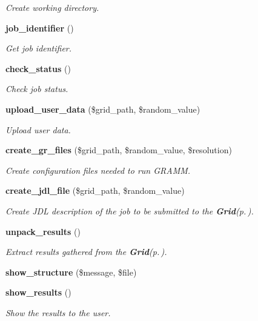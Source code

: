 \begin{CompactItemize}
\begin{CompactList}\small\item\em Create working directory. \item\end{CompactList}\item 
{\bf job\_\-identifier} ()
\begin{CompactList}\small\item\em Get job identifier. \item\end{CompactList}\item 
{\bf check\_\-status} ()
\begin{CompactList}\small\item\em Check job status. \item\end{CompactList}\item 
{\bf upload\_\-user\_\-data} (\$grid\_\-path, \$random\_\-value)
\begin{CompactList}\small\item\em Upload user data. \item\end{CompactList}\item 
{\bf create\_\-gr\_\-files} (\$grid\_\-path, \$random\_\-value, \$resolution)
\begin{CompactList}\small\item\em Create configuration files needed to run GRAMM. \item\end{CompactList}\item 
{\bf create\_\-jdl\_\-file} (\$grid\_\-path, \$random\_\-value)
\begin{CompactList}\small\item\em Create JDL description of the job to be submitted to the {\bf Grid}{\rm (p.\,\pageref{classGrid})}. \item\end{CompactList}\item 
{\bf unpack\_\-results} ()
\begin{CompactList}\small\item\em Extract results gathered from the {\bf Grid}{\rm (p.\,\pageref{classGrid})}. \item\end{CompactList}\item 
{\bf show\_\-structure} (\$message, \$file)
\item 
{\bf show\_\-results} ()
\begin{CompactList}\small\item\em Show the results to the user. \item\end{CompactList}\end{CompactItemize}


